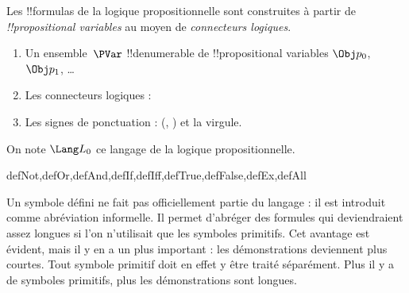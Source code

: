 \documentclass[../../../include/open-logic-section]{subfiles}
\begin{document}


Les !!{formula}s de la logique propositionnelle sont construites à
partir de \emph{!!{propositional variable}s}%
%
 au moyen de \emph{connecteurs logiques}.

\begin{enumerate}
\item Un ensemble~$\PVar$ !!{denumerable} de
  !!{propositional variable}s $\Obj p_0$, $\Obj p_1$, \dots
{}
\item Les connecteurs logiques :
  \startycommalist
\item Les signes de ponctuation : (, ) et la virgule.
\end{enumerate}

On note $\Lang L_0$ ce langage de la logique propositionnelle.


\begin{tagblock}{defNot,defOr,defAnd,defIf,defIff,defTrue,defFalse,defEx,defAll}
\begin{explain}
Un symbole défini ne fait pas officiellement partie du langage :
il est introduit comme abréviation informelle. Il permet d'abréger
des formules qui deviendraient assez longues si l'on n'utilisait que
les symboles primitifs. Cet avantage est évident, mais il y en a un
plus important : les démonstrations deviennent plus courtes. Tout
symbole primitif doit en effet y être traité séparément. Plus il y a
de symboles primitifs, plus les démonstrations sont longues.
\end{explain}
\end{tagblock}
\end{document}
